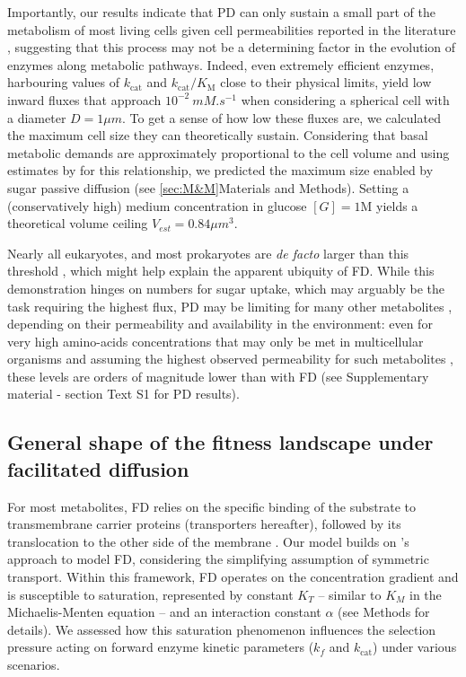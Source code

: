 \documentclass[nogrid,crop,final]{MBE2}%
\begin{document}
Importantly, our results indicate that PD can only sustain a small part of the metabolism of most living cells given cell permeabilities reported in the literature \citep{Wood68,Milo10}, suggesting that this process may not be a determining factor in the evolution of enzymes along metabolic pathways. Indeed, even extremely efficient enzymes, harbouring values of $k_\text{cat}$ and $k_\text{cat}/K_\text{M}$ close to their physical limits, yield low inward fluxes that approach $10^{-2}~mM.s^{-1}$ when considering a spherical cell with a diameter $D=1 \mu m$. To get a sense of how low these fluxes are, we calculated the maximum cell size they can theoretically sustain. Considering that basal metabolic demands are approximately proportional to the cell volume and using estimates by \citet{Lynch15} for this relationship, we predicted the maximum size enabled by sugar passive diffusion (see \ref{sec:M&M}Materials and Methods). Setting a (conservatively high) medium concentration in glucose $[G]=1$M yields a theoretical volume ceiling $V_{est}=0.84 \mu m^3$. 

Nearly all eukaryotes, and most prokaryotes are \textit{de facto} larger than this threshold \citep{Heim17}, which might help explain the apparent ubiquity of FD. While this demonstration hinges on numbers for sugar uptake, which may arguably be the task requiring the highest flux, PD may be limiting for many other metabolites \citep{Boer10}, depending on their permeability and availability in the environment: even for very high amino-acids concentrations that may only be met in multicellular organisms \citep{Schmidt16} and assuming the highest observed permeability for such metabolites \citep{Chakrabarti94}, these levels are orders of magnitude lower than with FD (see Supplementary material - section Text S1 for PD results). 

\subsection{General shape of the fitness landscape under facilitated diffusion}

For most metabolites, FD relies on the specific binding of the substrate to transmembrane carrier proteins (transporters hereafter), followed by its translocation to the other side of the membrane \citep{danielli1954,Kotyk67,Stein86d}. Our model builds on \citet{Kuile94}'s approach to model FD, considering the simplifying assumption of symmetric transport. Within this framework, FD operates on the concentration gradient \citep{Bosdriesz18} and is susceptible to saturation, represented by constant $K_T$ -- similar to $K_M$ in the Michaelis-Menten equation -- and an interaction constant $\alpha$ (see Methods for details). We assessed how this saturation phenomenon influences the selection pressure acting on forward enzyme kinetic parameters ($k_f$ and $k_\text{cat}$) under various scenarios. 
\end{document}
